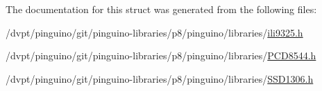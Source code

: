 The documentation for this struct was generated from the following files\-:\begin{DoxyCompactItemize}
\item 
/dvpt/pinguino/git/pinguino-\/libraries/p8/pinguino/libraries/\hyperlink{ili9325_8h}{ili9325.\-h}\item 
/dvpt/pinguino/git/pinguino-\/libraries/p8/pinguino/libraries/\hyperlink{p8_2pinguino_2libraries_2_p_c_d8544_8h}{P\-C\-D8544.\-h}\item 
/dvpt/pinguino/git/pinguino-\/libraries/p8/pinguino/libraries/\hyperlink{p8_2pinguino_2libraries_2_s_s_d1306_8h}{S\-S\-D1306.\-h}\end{DoxyCompactItemize}
